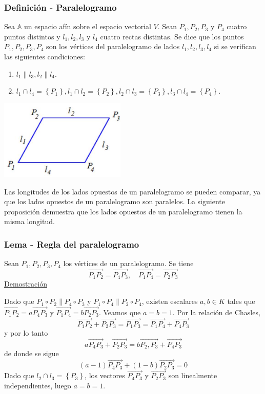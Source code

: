 \documentclass[12pt, a4paper, ones, notitlepage, openany,titlepage]{article}
\newcommand{\demostracion}{\noindent\underline{Demostración}}
\begin{document}
\subsubsection{Definición - Paralelogramo}
Sea $\mathbb{A}$ un espacio afín sobre el espacio vectorial $V$. Sean $P_{1}, P_{2}, P_{3}$ y $P_{4}$ cuatro puntos distintos y $l_{1}, l_{2}, l_{3}$ y $l_{4}$ cuatro rectas distintas. Se dice que los puntos $P_{1}, P_{2}, P_{3}, P_{4}$ son los vértices del paralelogramo de lados $l_{1}, l_{2}, l_{3}, l_{4}$ si se verifican las siguientes condiciones:
\begin{enumerate}[label=(\arabic*)]
\item $l_{1}\left\|l_{3}, l_{2}\right\| l_{4}$.

\item $l_{1} \cap l_{4}=\left\{P_{1}\right\}, l_{1} \cap l_{2}=\left\{P_{2}\right\}, l_{2} \cap l_{3}=\left\{P_{3}\right\}, l_{3} \cap l_{4}=\left\{P_{4}\right\}$.
\end{enumerate}
\begin{center}
\includegraphics[max width=6cm]{2023_03_01_7659aec5e35f9a9b2d3cg-19}
\end{center}

Las longitudes de los lados opuestos de un paralelogramo se pueden comparar, ya que los lados opuestos de un paralelogramo son paralelos. La siguiente proposición demuestra que los lados opuestos de un paralelogramo tienen la misma longitud.

\subsubsection{Lema - Regla del paralelogramo}
Sean $P_{1}, P_{2}, P_{3}, P_{4}$ los vértices de un paralelogramo. Se tiene
$$
\overrightarrow{P_{1} P_{2}}=\overrightarrow{P_{4} P_{3}}, \quad \overrightarrow{P_{1} P_{4}}=\overrightarrow{P_{2} P_{3}}
$$
\demostracion

Dado que $P_{1} \circ P_{2} \| P_{4} \circ P_{3}$ y $P_{1} \circ P_{4} \| P_{2} \circ P_{4}$, existen escalares $a, b \in K$ tales que $\overrightarrow{P_{1} P_{2}}=a \overrightarrow{P_{4} P_{3}}$ y $\overrightarrow{P_{1} P_{4}}=b \overrightarrow{P_{2} P_{3}}$. Veamos que $a=b=1$. Por la relación de Chasles,
$$
\overrightarrow{P_{1} P_{2}}+\overrightarrow{P_{2} P_{3}}=\overrightarrow{P_{1} P_{3}}=\overrightarrow{P_{1} P_{4}}+\overrightarrow{P_{4} P_{3}}
$$
y por lo tanto
$$
a \overrightarrow{P_{4} P_{3}}+\overrightarrow{P_{2} P_{3}}=b \overrightarrow{P_{2}, P_{3}}+\overrightarrow{P_{4} P_{3}}
$$
de donde se sigue
$$
(a-1) \overrightarrow{P_{4} P_{3}}+(1-b) \overrightarrow{P_{2} P_{3}}=0
$$
Dado que $l_{2} \cap l_{3}=\left\{P_{3}\right\}$, los vectores $\overrightarrow{P_{4} P_{3}}$ y $\overrightarrow{P_{2} P_{3}}$ son linealmente independientes, luego $a=b=1$.
\end{document}
